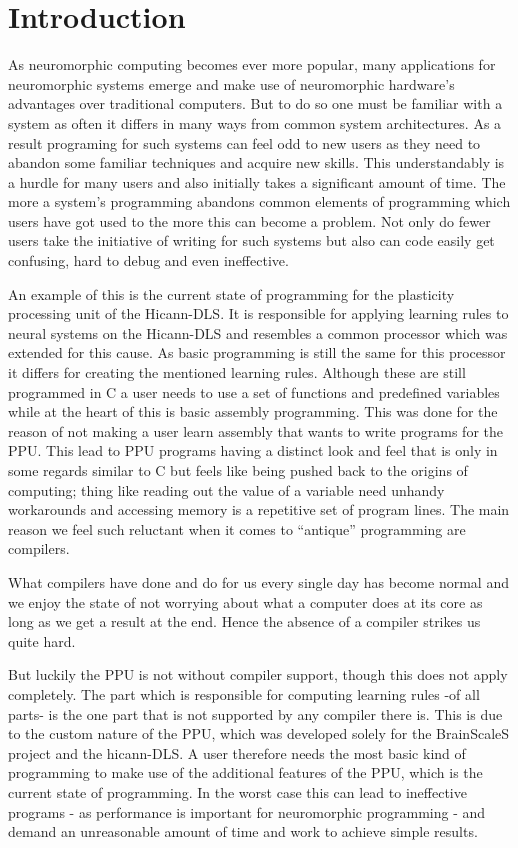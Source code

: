 \chapter{Introduction}
\label{chapter:introduction}

As neuromorphic computing becomes ever more popular, many applications for neuromorphic systems emerge and make use of neuromorphic hardware's advantages over traditional computers.
But to do so one must be familiar with a system as often it differs in many ways from common system architectures.
As a result programing for such systems can feel odd to new users as they need to abandon some familiar techniques and acquire new skills.
This understandably is a hurdle for many users and also initially takes a significant amount of time. 
The more a system's programming abandons common elements of programming which users have got used to the more this can become a problem.
Not only do fewer users take the initiative of writing for such systems but also can code easily get confusing, hard to debug and even ineffective.

An example of this is the current state of programming for the plasticity processing unit of the Hicann-DLS.
It is responsible for applying learning rules to neural systems on the Hicann-DLS and resembles a common processor which was extended for this cause.
As basic programming is still the same for this processor it differs for creating the mentioned learning rules.
Although these are still programmed in C a user needs to use a set of functions and predefined variables while at the heart of this is basic assembly programming.
This was done for the reason of not making a user learn assembly that wants to write programs for the PPU.
This lead to PPU programs having a distinct look and feel that is only in some regards similar to C but feels like being pushed back to the origins of computing; thing like reading out the value of a variable need unhandy workarounds and accessing memory is a repetitive set of program lines.
The main reason we feel such reluctant when it comes to ``antique'' programming are compilers.

What compilers have done and do for us every single day has become normal and we enjoy the state of not worrying about what a computer does at its core as long as we get a result at the end.
Hence the absence of a compiler strikes us quite hard.

But luckily the PPU is not without compiler support, though this does not apply completely.
The part which is responsible for computing learning rules -of all parts- is the one part that is not supported by any compiler there is.
This is due to the custom nature of the PPU, which was developed solely for the BrainScaleS project and the hicann-DLS.
A user therefore needs the most basic kind of programming to make use of the additional features of the PPU, which is the current state of programming.
In the worst case this can lead to ineffective programs - as performance is important for neuromorphic programming - and demand an unreasonable amount of time and work to achieve simple results.

